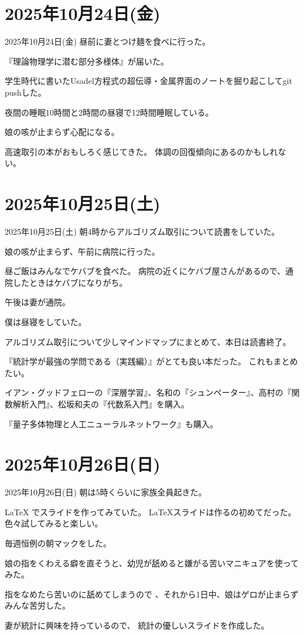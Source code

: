 \documentclass[dvipdfmx, autodetect-engine, aspectratio=169, 10.5pt]{beamer}
\begin{document}
\section{2025年10月24日(金)}

\begin{frame}{2025年10月24日(金)}
昼前に妻とつけ麺を食べに行った。

『理論物理学に潜む部分多様体』が届いた。

学生時代に書いたUsadel方程式の超伝導・金属界面のノートを掘り起こしてgit pushした。

夜間の睡眠10時間と2時間の昼寝で12時間睡眠している。

娘の咳が止まらず心配になる。

高速取引の本がおもしろく感じてきた。
体調の回復傾向にあるのかもしれない。
\end{frame}

\section{2025年10月25日(土)}

\begin{frame}{2025年10月25日(土)}
朝4時からアルゴリズム取引について読書をしていた。

娘の咳が止まらず、午前に病院に行った。

昼ご飯はみんなでケバブを食べた。
病院の近くにケバブ屋さんがあるので、通院したときはケバブになりがち。

午後は妻が通院。

僕は昼寝をしていた。

アルゴリズム取引について少しマインドマップにまとめて、本日は読書終了。

『統計学が最強の学問である（実践編）』がとても良い本だった。
これもまとめたい。

イアン・グッドフェローの『深層学習』、名和の『シュンペーター』、高村の『関数解析入門』、松坂和夫の『代数系入門』を購入。

『量子多体物理と人工ニューラルネットワーク』も購入。
\end{frame}

\section{2025年10月26日(日)}

\begin{frame}{2025年10月26日(日)}
朝は5時くらいに家族全員起きた。

LaTeX でスライドを作ってみていた。
LaTeXスライドは作るの初めてだった。
色々試してみると楽しい。

毎週恒例の朝マックをした。

娘の指をくわえる癖を直そうと、幼児が舐めると嫌がる苦いマニキュアを使ってみた。

指をなめたら苦いのに舐めてしまうので 、それから1日中、娘はゲロが止まらずみんな苦労した。

妻が統計に興味を持っているので、 統計の優しいスライドを作成した。
\end{frame}
\end{document}
